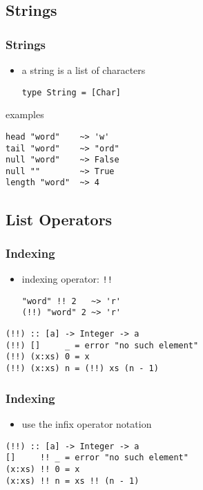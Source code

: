 \documentclass[dvipsnames]{beamer}
\theoremstyle{plain}
\begin{document}
\subsection{Strings}

\begin{frame}[fragile]
  \frametitle{Strings}

  \begin{itemize}
    \item a string is a list of characters
    \begin{lstlisting}
type String = [Char]
    \end{lstlisting}
  \end{itemize}

  \pause
  \begin{exampleblock}{examples}
    \begin{lstlisting}
head "word"    ~> 'w'
tail "word"    ~> "ord"
null "word"    ~> False
null ""        ~> True
length "word"  ~> 4
    \end{lstlisting}
  \end{exampleblock}
\end{frame}

\subsection{List Operators}

\begin{frame}[fragile]
  \frametitle{Indexing}

  \begin{itemize}
    \item indexing operator: \lstinline|!!|
    \begin{lstlisting}[frame=none]
"word" !! 2   ~> 'r'
(!!) "word" 2 ~> 'r'
    \end{lstlisting}
  \end{itemize}

  \pause
  \begin{exampleblock}{}
    \begin{lstlisting}
(!!) :: [a] -> Integer -> a
(!!) []     _ = error "no such element"
(!!) (x:xs) 0 = x
(!!) (x:xs) n = (!!) xs (n - 1)
    \end{lstlisting}
  \end{exampleblock}
\end{frame}

\begin{frame}[fragile]
  \frametitle{Indexing}

  \begin{itemize}
    \item use the infix operator notation
  \end{itemize}

  \begin{exampleblock}{}
    \begin{lstlisting}
(!!) :: [a] -> Integer -> a
[]     !! _ = error "no such element"
(x:xs) !! 0 = x
(x:xs) !! n = xs !! (n - 1)
    \end{lstlisting}
  \end{exampleblock}
\end{frame}
\end{document}
